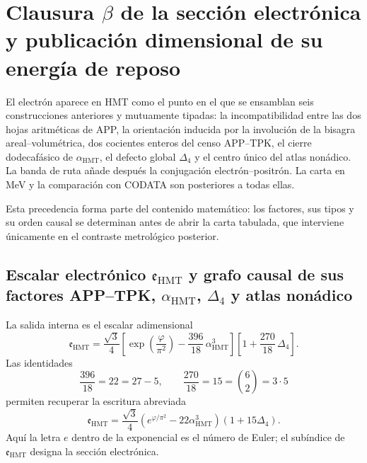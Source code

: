 \section{Clausura \(\beta\) de la sección electrónica y publicación dimensional de su energía de reposo}
\label{chap:biografia-electron-rev6}

El electrón aparece en HMT como el punto en el que se ensamblan seis
construcciones anteriores y mutuamente tipadas: la incompatibilidad entre
las dos hojas aritméticas de APP, la orientación inducida por la involución
de la bisagra areal--volumétrica, dos cocientes enteros del censo APP--TPK,
el cierre
dodecafásico de \(\alpha_{\mathrm{HMT}}\), el defecto global
\(\Delta_4\) y el centro único del atlas nonádico. La banda de ruta añade
después la conjugación electrón--positrón. La carta en MeV y la comparación
con CODATA son posteriores a todas ellas.

Esta precedencia forma parte del contenido matemático: los factores, sus
tipos y su orden causal se determinan antes de abrir la carta tabulada, que
interviene únicamente en el contraste metrológico posterior.

\subsection{Escalar electrónico \(\mathfrak e_{\mathrm{HMT}}\) y grafo causal de sus factores APP–TPK, \(\alpha_{\mathrm{HMT}}\), \(\Delta_4\) y atlas nonádico}

La salida interna es el escalar adimensional
\begin{equation}
 \label{eq:electron-holografico-rev6}
 \boxed{
 \mathfrak e_{\mathrm{HMT}}
 =
 \frac{\sqrt3}{4}
 \left[
 \exp\!\left(\frac{\varphi}{\pi^2}\right)
 -\frac{396}{18}\,\alpha_{\mathrm{HMT}}^3
 \right]
 \left[
 1+\frac{270}{18}\,\Delta_4
 \right].}
\end{equation}
Las identidades
\[
 \frac{396}{18}=22=27-5,
 \qquad
 \frac{270}{18}=15=\binom62=3\cdot5
 \]
permiten recuperar la escritura abreviada
\[
 \mathfrak e_{\mathrm{HMT}}
 =
 \frac{\sqrt3}{4}
 \left(e^{\varphi/\pi^2}-22\alpha_{\mathrm{HMT}}^3\right)
 (1+15\Delta_4).
\]
Aquí la letra \(e\) dentro de la exponencial es el número de Euler; el
subíndice de \(\mathfrak e_{\mathrm{HMT}}\) designa la sección electrónica.

